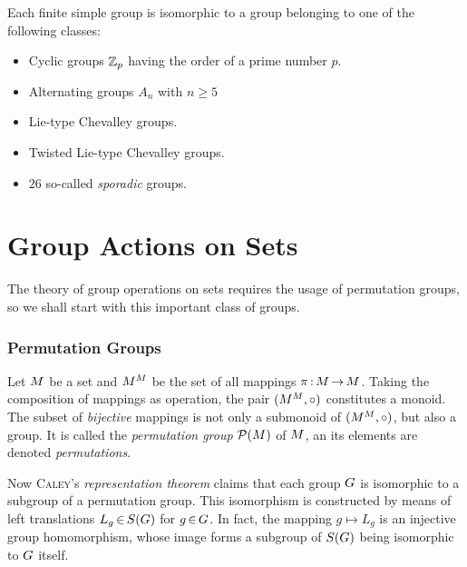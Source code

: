 \documentclass[11pt,twoside]{article}
\begin{document}
\begin{theorem}
Each finite simple group is isomorphic to a group belonging to one of
the following classes:

\begin{itemize}[leftmargin=15pt]
\item[1.]
Cyclic groups ${\mathbb{Z}}_p$ having the order of a prime number $p$.

\item[2.]
Alternating groups $A_n$ with $n \geq 5$

\item[3.]
Lie-type Chevalley groups.

\item[4.]
Twisted Lie-type Chevalley groups.

\item[5.]
$26$ so-called \textit{sporadic} groups.
\end{itemize}
\end{theorem}

\part{Group Actions on Sets}                                                   %
The theory of group operations on sets requires the usage of permutation groups,
so we shall start with this important class of groups.

\section{Permutation Groups}
Let $M$ be a set and $M^{M}$ be the set of all mappings
$\pi {\,:\,} M {\,\to\,} M$.
Taking the composition of mappings as operation,
the pair $(M^{M},\circ)$ constitutes a monoid.
The subset of \textit{bijective} mappings is not only a submonoid
of $(M^{M},\circ)$,
but also a group.
It is called the \textit{permutation group} ${\mathcal{P}}(M)$ of $M$,
an its elements are denoted \textit{permutations}.

\subparagraph{}
Now \textsc{Caley}'s \textit{representation theorem} claims
that each group $G$ is isomorphic to a subgroup of a permutation group.
This isomorphism is constructed by means of
left translations $L_g {\,\in\,} S(G)$ for $g {\,\in\,} G$.
In fact,
the mapping $g \mapsto L_g$ is an injective group homomorphism,
whose image forms a subgroup of $S(G)$ being isomorphic to $G$ itself.
\end{document}
